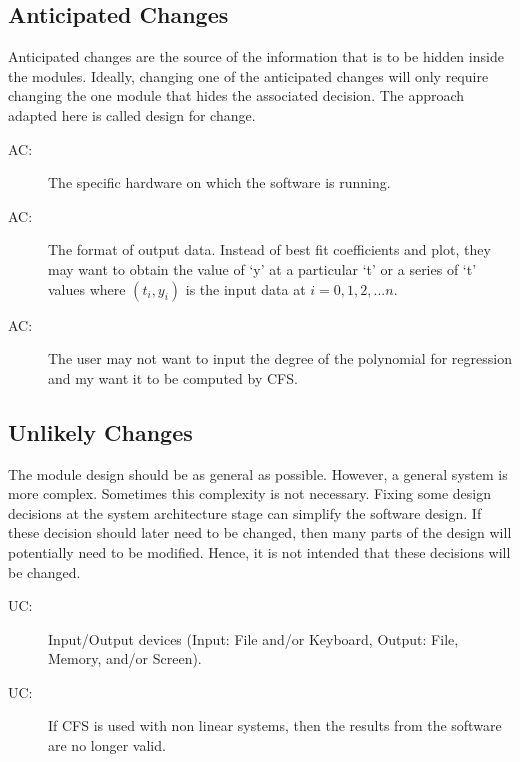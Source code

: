 \documentclass[12pt, titlepage]{article}
\newcounter{acnum}
\newcommand{\actheacnum}{AC\theacnum}
\newcounter{ucnum}
\newcommand{\uctheucnum}{UC\theucnum}
\newcommand{\famname}{CFS} %
\begin{document}
\subsection{Anticipated Changes} \label{SecAchange}

Anticipated changes are the source of the information that is to be hidden
inside the modules. Ideally, changing one of the anticipated changes will only
require changing the one module that hides the associated decision. The approach
adapted here is called design for
change.

\begin{description}
\item[ \actheacnum \label{acHardware}:] The specific
  hardware on which the software is running. 
\item[ \actheacnum \label{acOutput}:] The format of output
  data. Instead of best fit coefficients and plot, they may want to obtain the
  value of `y' at a particular `t' or a series of `t' values where $(t_i,y_i)$
  is the input data at $i = 0,1,2,...n$.
\item[ \actheacnum \label{acDegree}:] The user may not
  want to input the degree of the polynomial for regression and my want it to be
  computed by \famname{}.
\end{description}

\subsection{Unlikely Changes} \label{SecUchange}

The module design should be as general as possible. However, a general system is
more complex. Sometimes this complexity is not necessary. Fixing some design
decisions at the system architecture stage can simplify the software design. If
these decision should later need to be changed, then many parts of the design
will potentially need to be modified. Hence, it is not intended that these
decisions will be changed.

\begin{description}
\item[ \uctheucnum \label{ucIO}:] Input/Output devices
  (Input: File and/or Keyboard, Output: File, Memory, and/or Screen).
\item[ \uctheucnum \label{ucNonLinear}:] If \famname{} is
  used with non linear systems, then the results from the software are no longer
  valid.
\end{description}
\end{document}
